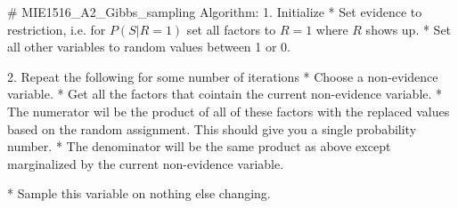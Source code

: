 # MIE1516_A2_Gibbs_sampling
Algorithm: 
1. Initialize 
* Set evidence to restriction, i.e. for $P(S|R=1)$ set all factors to $R=1$ where $R$ shows up. 
* Set all other variables to random values between 1 or 0. 

2. Repeat the following for some number of iterations 
* Choose a non-evidence variable. 
* Get all the factors that cointain the current non-evidence variable.
  * The numerator wil be the product of all of these factors with the replaced values based on the random assignment. This should give you a single probability number. 
  * The denominator will be the same product as above except marginalized by the current non-evidence variable. 
  
* Sample this variable on nothing else changing. 
